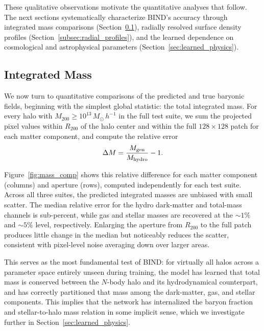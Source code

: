 \documentclass[linenumbers,trackchanges, twocolumn]{aastex701}
\begin{document}
These qualitative observations motivate the quantitative analyses that follow. The next sections systematically characterize \textsc{BIND}'s accuracy through integrated mass comparisons (Section~\ref{subsec:integrated_mass}), radially resolved surface density profiles (Section~\ref{subsec:radial_profiles}), and the learned dependence on cosmological and astrophysical parameters (Section~\ref{sec:learned_physics}).

\subsection{Integrated Mass}
\label{subsec:integrated_mass}


 We now turn to quantitative comparisons of the predicted and true baryonic fields, beginning with the simplest global statistic: the total integrated mass. For every halo with $M_{200} \geq 10^{13}\,M_{\odot}\,h^{-1}$ in the full test suite, we sum the projected pixel values within $R_{200}$ of the halo center and within the full $128\times128$ patch for each matter component, and compute the relative error
\begin{equation}
    \Delta M = \frac{M_{\rm gen}}{M_{\rm hydro}} - 1.
    \label{eq:mass_err}
\end{equation}

Figure~\ref{fig:mass_comp} shows this relative difference for each matter component (columns) and aperture (rows), computed independently for each test suite. Across all three suites, the predicted integrated masses are unbiased with small scatter. The median relative error for the hydro dark-matter and total-mass channels is sub-percent, while gas and stellar masses are recovered at the ${\sim}1\%$ and ${\sim}5\%$ level, respectively. Enlarging the aperture from $R_{200}$ to the full patch produces little change in the median but noticeably reduces the scatter, consistent with pixel-level noise averaging down over larger areas.

This serves as the most fundamental test of \textsc{BIND}: for virtually all halos across a parameter space entirely unseen during training, the model has learned that total mass is conserved between the $N$-body halo and its hydrodynamical counterpart, and has correctly partitioned that mass among the dark-matter, gas, and stellar components. This implies that the network has internalized the baryon fraction and stellar-to-halo mass relation in some implicit sense, which we investigate further in Section~\ref{sec:learned_physics}.
\end{document}
